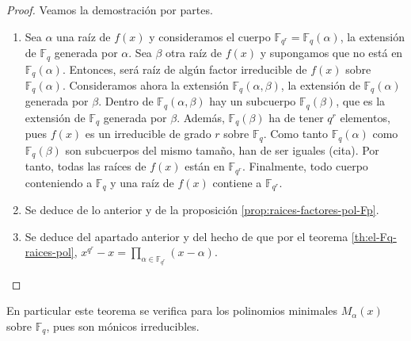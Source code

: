 \begin{proof}
  Veamos la demostración por partes.
  \begin{enumerate}
    \item Sea \(\alpha\) una raíz de \(f(x)\) y consideramos el cuerpo \(\mathbb F_{q^r} = \mathbb F_{q}(\alpha)\), la extensión de \(\mathbb F_q\) generada por \(\alpha\).
    Sea \(\beta\) otra raíz de \(f(x)\) y supongamos que no está en \(\mathbb F_{q}(\alpha)\).
    Entonces, será raíz de algún factor irreducible de \(f(x)\) sobre \(\mathbb F_{q}(\alpha)\).
    Consideramos ahora la extensión \(\mathbb F_{q}(\alpha, \beta)\), la extensión de \(\mathbb F_{q}(\alpha)\) generada por \(\beta\).
    Dentro de \(\mathbb F_{q}(\alpha, \beta)\) hay un subcuerpo \(\mathbb F_{q}(\beta)\), que es la extensión de \(\mathbb F_q\) generada por \(\beta\).
    Además, \(\mathbb F_{q}(\beta)\) ha de tener \(q^r\) elementos, pues \(f(x)\) es un irreducible de grado \(r\) sobre \(\mathbb F_q\).
    Como tanto \(\mathbb F_{q}(\alpha)\) como \(\mathbb F_{q}(\beta)\) son subcuerpos del mismo tamaño, han de ser iguales (cita). %
    Por tanto, todas las raíces de \(f(x)\) están en \(\mathbb F_{q^r}\).
    Finalmente, todo cuerpo conteniendo a \(\mathbb F_q\) y una raíz de \(f(x)\) contiene a \(\mathbb F_{q^r}\).
    \item Se deduce de lo anterior y de la proposición \ref{prop:raices-factores-pol-Fp}.
    \item Se deduce del apartado anterior y del hecho de que por el teorema \ref{th:el-Fq-raices-pol}, \(x^{q^r} - x = \prod_{\alpha \in \mathbb F_{q^r}}(x - \alpha)\).\qedhere
  \end{enumerate}
\end{proof}

En particular este teorema se verifica para los polinomios minimales \(M_{\alpha}(x)\) sobre \(\mathbb F_q\), pues son mónicos irreducibles.

